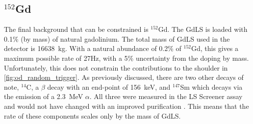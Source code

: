 






\subsection{${}^{152}$Gd}
\par
The final background that can be constrained is ${}^{152}$Gd.
The GdLS is loaded with 0.1\% (by mass) of natural gadolinium.
The total mass of GdLS used in the detector is 16638~kg.
With a natural abundance of 0.2\% of ${}^{152}$Gd, this gives a maximum possible rate of 27Hz, with a 5\% uncertainty from the doping by mass.
Unfortunately, this does not constrain the contributions to the shoulder in \autoref{fig:od_random_trigger}.
As previously discussed, there are two other decays of note, ${}^{14}$C, a $\beta$ decay with an end-point of 156~keV, and ${}^{147}$Sm which decays via the emission of a 2.3~MeV $\alpha$.
All three were measured in the LS Screener assay and would not have changed with an improved purification \cite{scotthaselschwardt_thesis_ref}.
This means that the rate of these components scales only by the mass of GdLS.


